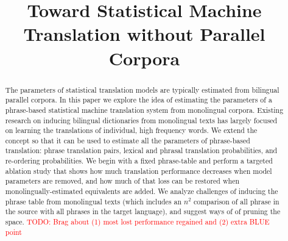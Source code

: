 \documentclass[11pt]{article}
\title{Toward Statistical Machine Translation without Parallel Corpora}
\author{}
\date{}
\newcommand{\todo}[1]{\textcolor{red}{TODO: #1}}
\begin{document}
\maketitle
\begin{abstract}
The parameters of statistical translation models are typically estimated from bilingual parallel corpora.   In this paper we explore the idea of estimating the parameters of a phrase-based statistical machine translation system from monolingual corpora.  Existing research on inducing bilingual dictionaries from monolingual texts has largely focused on learning the translations of individual, high frequency words.   We extend the concept so that it can be used to estimate all the parameters of phrase-based translation: phrase translation pairs, lexical and phrasal translation probabilities, and re-ordering probabilities.  We begin with a fixed phrase-table and perform a targeted ablation study that shows how much translation performance decreases when model parameters are removed, and how much of that loss can be restored when monolingually-estimated equivalents are added.  We analyze challenges of  inducing the phrase table from monolingual texts (which includes an $n^2$ comparison of all phrase in the source with all phrases in the target language), and suggest ways of of pruning the space.
\todo{Brag about (1) most lost performance regained and (2) extra BLUE point}



\end{abstract}
\end{document}
